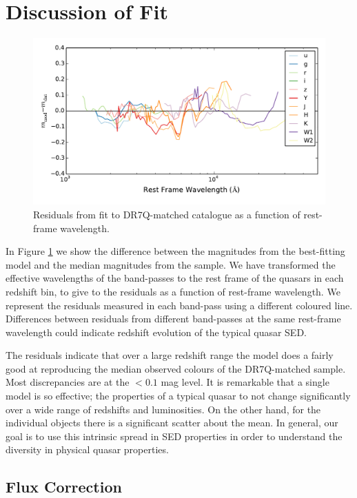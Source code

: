 \section{Discussion of Fit}

\begin{figure}
  \centering
  \includegraphics[width=\textwidth]{figures/chapter05/residuals_nocorr}
  \caption{Residuals from fit to DR7Q-matched catalogue as a function of rest-frame wavelength.}
  \label{fig:residuals}
\end{figure}

In Figure \ref{fig:residuals} we show the difference between the magnitudes from the best-fitting model and the median magnitudes from the sample. 
We have transformed the effective wavelengths of the band-passes to the rest frame of the quasars in each redshift bin, to give to the residuals as a function of rest-frame wavelength. 
We represent the residuals measured in each band-pass using a different coloured line. 
Differences between residuals from different band-passes at the same rest-frame wavelength could indicate redshift evolution of the typical quasar SED. 

The residuals indicate that over a large redshift range the model does a fairly good at reproducing the median observed colours of the DR7Q-matched sample. 
Most discrepancies are at the $<0.1$ mag level. 
It is remarkable that a single model is so effective; the properties of a typical quasar to not change significantly over a wide range of redshifts and luminosities. 
On the other hand, for the individual objects there is a significant scatter about the mean. 
In general, our goal is to use this intrinsic spread in SED properties in order to understand the diversity in physical quasar properties. 

\subsection{Flux Correction}

